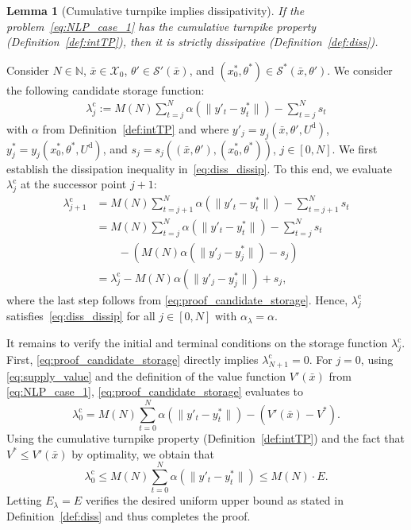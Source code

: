 \documentclass[a4paper,fleqn]{cas-dc}
\newtheorem{lem}{Lemma}
\begin{document}
\begin{lem}[Cumulative turnpike implies dissipativity]\label{lem:intTP2diss}
	If the problem~\eqref{eq:NLP_case_1} has the cumulative turnpike property (Definition~\ref{def:intTP}), then it is strictly dissipative (Definition~\ref{def:diss}).
\end{lem}
\begin{pf}
	Consider $N\in\mathbb{N}$, $\bar{x}\in\mathcal{X}_0$, $\theta'\in\mathcal{S}'(\bar{x})$, and $(x_0^*,\theta^*)\in\mathcal{S}^*(\bar{x},\theta')$. We consider the following candidate storage function:
	\begin{align}
		\lambda^\mathrm{c}_j:=M(N)\sum_{t=j}^N\alpha(\|y'_t-y_t^*\|)-\sum_{t=j}^Ns_t \label{eq:proof_candidate_storage}
	\end{align}
	with $\alpha$ from Definition~\ref{def:intTP} and where $y'_j=y_j(\bar{x},\theta',U^\mathrm{d})$, $y^*_j=y_j(x_0^*,\theta^*,U^\mathrm{d})$, and $s_j = s_j((\bar{x},\theta'),(x_0^*,\theta^*))$, $j\in[0,N]$.
	We first establish the dissipation inequality in~\eqref{eq:diss_dissip}.
	To this end, we evaluate $\lambda^\mathrm{c}_j$ at the successor point $j+1$:
	\begin{align*}
		\lambda^\mathrm{c}_{j+1} &= M(N)\sum_{t=j+1}^N\alpha(\|y'_t-y^*_t\|)-\sum_{t=j+1}^Ns_t\\
		&= M(N)\sum_{t=j}^N\alpha(\|y'_t-y^*_t\|)-\sum_{t=j}^Ns_t\\ &\qquad -(M(N)\alpha(\|y'_j-y^*_j\|)-s_j)\\
		&= \lambda^\mathrm{c}_j -M(N)\alpha(\|y'_j-y^*_j\|)+s_j,
	\end{align*}
	where the last step follows from \eqref{eq:proof_candidate_storage}.
	Hence, $\lambda^\mathrm{c}_j$ satisfies~\eqref{eq:diss_dissip} for all $j\in[0,N]$ with $\alpha_\lambda=\alpha$.
	
	It remains to verify the initial and terminal conditions on the storage function $\lambda^\mathrm{c}_j$. First, \eqref{eq:proof_candidate_storage} directly implies $\lambda^\mathrm{c}_{N+1}=0$. For $j=0$, using \eqref{eq:supply_value} and the definition of the value function $V'(\bar{x})$ from \eqref{eq:NLP_case_1}, \eqref{eq:proof_candidate_storage} evaluates to
	\begin{equation*}
		\lambda^\mathrm{c}_0
		= M(N) \sum_{t=0}^N\alpha(\|y'_t-y^*_t\|)-(V'(\bar{x})-V^*).
	\end{equation*}
	Using the cumulative turnpike property (Definition~\ref{def:intTP}) and the fact that $V^*\leq V'(\bar{x})$ by optimality, we obtain that
	\begin{equation*}
		\lambda^\mathrm{c}_0\leq M(N)\sum_{t=0}^N\alpha(\|y'_t-y^*_t\|) \leq M(N)\cdot E.
	\end{equation*}
	Letting $E_\lambda=E$ verifies the desired uniform upper bound as stated in Definition~\ref{def:diss} and thus completes the proof.
\end{pf}
\end{document}
